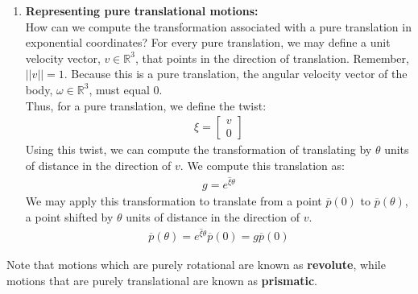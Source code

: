 \documentclass[oneside]{book}
\begin{document}
\begin{enumerate}
    \item \textbf{Representing pure translational motions:}\\
    How can we compute the transformation associated with a pure translation in exponential coordinates? For every pure translation, we may define a unit velocity vector, $v \in \mathbb{R}^3$, that points in the direction of translation. Remember, $||v|| = 1$. Because this is a pure translation, the angular velocity vector of the body, $\omega \in \mathbb{R}^3$, must equal 0.\\
    Thus, for a pure translation, we define the twist:
    \begin{align}
        \xi = 
        \begin{bmatrix}
            v\\
            0
        \end{bmatrix}
    \end{align}
    Using this twist, we can compute the transformation of translating by $\theta$ units of distance in the direction of $v$. We compute this translation as:
    \begin{align}
        g = e^{\hat\xi \theta}
    \end{align}
    We may apply this transformation to translate from a point $\overline{p}(0)$ to $\overline{p}(\theta)$, a point shifted by $\theta$ units of distance in the direction of $v$.
    \begin{align}
        \overline{p}(\theta) = e^{\hat\xi \theta} \overline{p}(0) = g \overline{p}(0)
    \end{align}
\end{enumerate}
Note that motions which are purely rotational are known as \textbf{revolute}, while motions that are purely translational are known as \textbf{prismatic}. 
\end{document}
